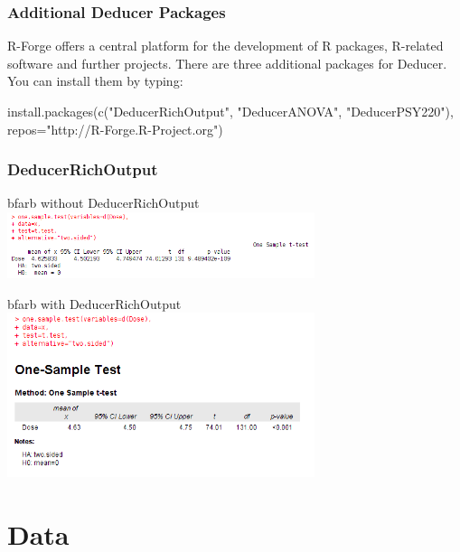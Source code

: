 \documentclass[xcolor={table}]{beamer}
\begin{document}
\begin{frame}[fragile]\frametitle{Additional Deducer Packages}
  R-Forge offers a central platform for the development of R packages, R-related software and further projects. 
  There are three additional packages for Deducer. You can install them by typing:
\begin{semiverbatim}
install.packages(c("DeducerRichOutput",
                   "DeducerANOVA",
                   "DeducerPSY220"),
                 repos="http://R-Forge.R-Project.org")
\end{semiverbatim}    
\end{frame}

\begin{frame}[shrink=15]\frametitle{DeducerRichOutput}
\begin{beamercolorbox}[sep=0.5em,wd=14cm]{bfarb}
without DeducerRichOutput\\
\includegraphics[width=9cm]{outputnormal.png}
\end{beamercolorbox}
\vspace*{0.4cm}
\begin{beamercolorbox}[sep=0.5em,wd=14cm]{bfarb}
with DeducerRichOutput\\
\includegraphics[width=9cm]{outputrich.png}\\
\end{beamercolorbox}
\end{frame}

\section{Data}
\end{document}
